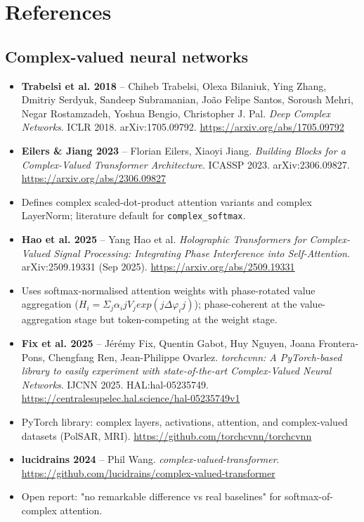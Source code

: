 \documentclass[11pt,a4paper]{article}
\theoremstyle{plain}
\theoremstyle{definition}
\begin{document}
\medskip

\section*{References}
\subsection*{Complex-valued neural networks}
\begin{itemize}
  \item \textbf{Trabelsi et al. 2018} -- Chiheb Trabelsi, Olexa Bilaniuk, Ying Zhang, Dmitriy Serdyuk, Sandeep Subramanian, João Felipe Santos, Soroush Mehri, Negar Rostamzadeh, Yoshua Bengio, Christopher J. Pal. \emph{Deep Complex Networks}. ICLR 2018. arXiv:1705.09792. \url{https://arxiv.org/abs/1705.09792}
  \item \textbf{Eilers \& Jiang 2023} -- Florian Eilers, Xiaoyi Jiang. \emph{Building Blocks for a Complex-Valued Transformer Architecture}. ICASSP 2023. arXiv:2306.09827. \url{https://arxiv.org/abs/2306.09827}
  \item Defines complex scaled-dot-product attention variants and complex LayerNorm; literature default for \texttt{complex\_softmax}.
  \item \textbf{Hao et al. 2025} -- Yang Hao et al. \emph{Holographic Transformers for Complex-Valued Signal Processing: Integrating Phase Interference into Self-Attention}. arXiv:2509.19331 (Sep 2025). \url{https://arxiv.org/abs/2509.19331}
  \item Uses softmax-normalised attention weights with phase-rotated value aggregation ($H_i = \Sigma _j \alpha _ij V_j exp(j \Delta \varphi _ij)$); phase-coherent at the value-aggregation stage but token-competing at the weight stage.
  \item \textbf{Fix et al. 2025} -- Jérémy Fix, Quentin Gabot, Huy Nguyen, Joana Frontera-Pons, Chengfang Ren, Jean-Philippe Ovarlez. \emph{torchcvnn: A PyTorch-based library to easily experiment with state-of-the-art Complex-Valued Neural Networks}. IJCNN 2025. HAL:hal-05235749. \url{https://centralesupelec.hal.science/hal-05235749v1}
  \item PyTorch library: complex layers, activations, attention, and complex-valued datasets (PolSAR, MRI). \url{https://github.com/torchcvnn/torchcvnn}
  \item \textbf{lucidrains 2024} -- Phil Wang. \emph{complex-valued-transformer}. \url{https://github.com/lucidrains/complex-valued-transformer}
  \item Open report: "no remarkable difference vs real baselines" for softmax-of-complex attention.
\end{itemize}
\end{document}
